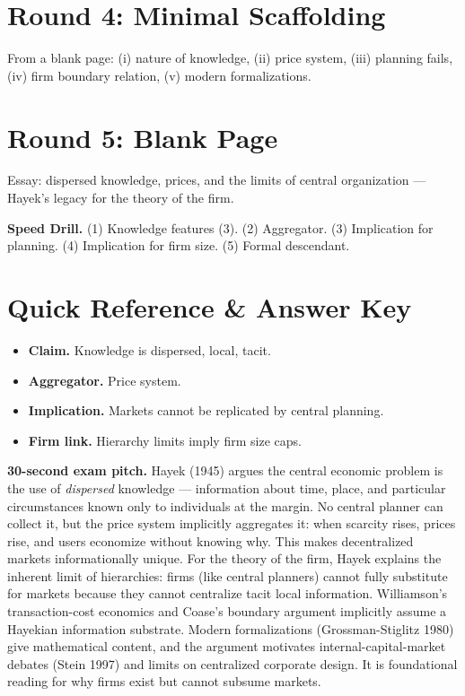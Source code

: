 \documentclass[11pt]{article}
\begin{document}
\section*{Round 4: Minimal Scaffolding}
From a blank page: (i) nature of knowledge, (ii) price system, (iii) planning fails, (iv) firm boundary relation, (v) modern formalizations.

\section*{Round 5: Blank Page}
Essay: dispersed knowledge, prices, and the limits of central organization --- Hayek's legacy for the theory of the firm.

\vspace{6pt}
\begin{drillbox}
\textbf{Speed Drill.} (1) Knowledge features (3). (2) Aggregator. (3) Implication for planning. (4) Implication for firm size. (5) Formal descendant.
\end{drillbox}

\section*{Quick Reference \& Answer Key}
\begin{answerbox}
\begin{itemize}
\item \textbf{Claim.} Knowledge is dispersed, local, tacit.
\item \textbf{Aggregator.} Price system.
\item \textbf{Implication.} Markets cannot be replicated by central planning.
\item \textbf{Firm link.} Hierarchy limits imply firm size caps.
\end{itemize}
\end{answerbox}

\begin{keybox}
\textbf{30-second exam pitch.} Hayek (1945) argues the central economic problem is the use of \emph{dispersed} knowledge --- information about time, place, and particular circumstances known only to individuals at the margin. No central planner can collect it, but the price system implicitly aggregates it: when scarcity rises, prices rise, and users economize without knowing why. This makes decentralized markets informationally unique. For the theory of the firm, Hayek explains the inherent limit of hierarchies: firms (like central planners) cannot fully substitute for markets because they cannot centralize tacit local information. Williamson's transaction-cost economics and Coase's boundary argument implicitly assume a Hayekian information substrate. Modern formalizations (Grossman-Stiglitz 1980) give mathematical content, and the argument motivates internal-capital-market debates (Stein 1997) and limits on centralized corporate design. It is foundational reading for why firms exist but cannot subsume markets.
\end{keybox}
\end{document}
